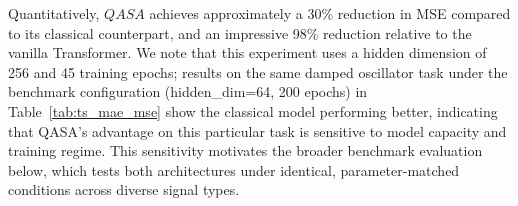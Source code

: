 \documentclass[conference]{IEEEtran}
\begin{document}
Quantitatively, $QASA$ achieves approximately a 30\% reduction in MSE compared to its classical counterpart, and an impressive 98\% reduction relative to the vanilla Transformer. We note that this experiment uses a hidden dimension of 256 and 45 training epochs; results on the same damped oscillator task under the benchmark configuration (hidden\_dim=64, 200 epochs) in Table~\ref{tab:ts_mae_mse} show the classical model performing better, indicating that QASA's advantage on this particular task is sensitive to model capacity and training regime. This sensitivity motivates the broader benchmark evaluation below, which tests both architectures under identical, parameter-matched conditions across diverse signal types.


\begin{table}[h]
\centering
\caption{Performance comparison across nine benchmark tasks (5 seeds, mean$\pm$std). Both models share nearly identical parameter counts (Classical: 200,257; QASA: 201,405). Bold indicates the better mean result per metric per task.}
\label{tab:ts_mae_mse}
\end{table}
\end{document}

